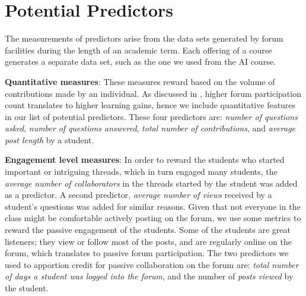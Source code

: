 \section{Potential Predictors}

The measurements of predictors arise from the data sets generated by
forum facilities during the length of an academic term. Each offering of
a course generates a separate data set, such as the one we used from
the AI course.

\textbf{Quantitative measures}: These measures reward based on the volume of contributions made by an individual. 
As discussed in \cite{wang2015investigating}, higher forum participation count translates to higher learning gains, hence we include quantitative features in our list of potential predictors. 
These four predictors are: \emph{number of questions
  asked}, \emph{number of questions answered}, \emph{total number of
  contributions}, and \emph{average post length} by a student.

    
\textbf{Engagement level measures}: In order to reward the students
who started important or intriguing threads, which in turn engaged
many students, the \emph{average number of collaborators} in the
threads started by the student was added as a predictor. A second
predictor, \emph{average number of views} received by a student's questions was added for similar reasons. Given that not everyone in the
class might be comfortable actively posting on the forum, we use some metrics to reward the passive engagement of the students. Some of the
students are great listeners; they view or follow most of the posts,
and are regularly online on the forum, which translates to passive forum participation. The two predictors we used to
apportion credit for passive collaboration on the forum are:
\emph{total number of days a student was logged into the forum}, and the number of \emph{posts viewed} by the student. 
  
